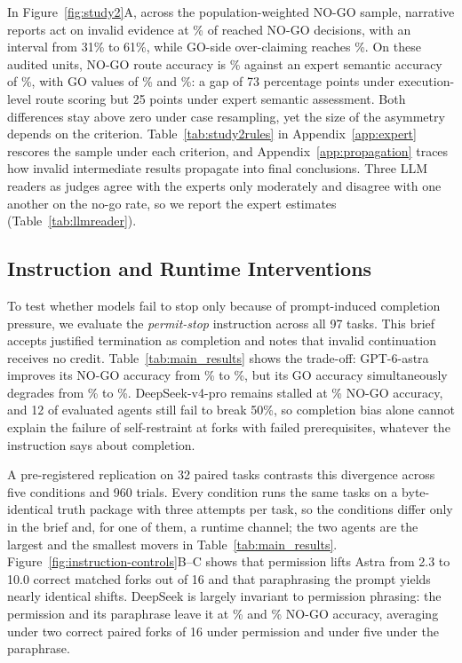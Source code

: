 \documentclass{article}
\begin{document}
In Figure~\ref{fig:study2}A, across the population-weighted NO-GO sample, narrative reports act on invalid evidence at \sTwoActed\% of reached NO-GO decisions, with an interval from 31\% to 61\%, while GO-side over-claiming reaches \sTwoGoActed\%. On these audited units, NO-GO route accuracy is \sTwoRouteStopRight\% against an expert semantic accuracy of \sTwoSemStop\%, with GO values of \sTwoRouteGoRight\% and \sTwoSemGo\%: a gap of 73 percentage points under execution-level route scoring but 25 points under expert semantic assessment. Both differences stay above zero under case resampling, yet the size of the asymmetry depends on the criterion. Table~\ref{tab:study2rules} in Appendix~\ref{app:expert} rescores the sample under each criterion, and Appendix~\ref{app:propagation} traces how invalid intermediate results propagate into final conclusions. Three LLM readers as judges \citep{zheng2023judging,zhuge2024agentjudge} agree with the experts only moderately and disagree with one another on the no-go rate, so we report the expert estimates (Table~\ref{tab:llmreader}).



\subsection{Instruction and Runtime Interventions}
\label{sec:control}

To test whether models fail to stop only because of prompt-induced completion pressure, we evaluate the \emph{permit-stop} instruction across all 97 tasks. This brief accepts justified termination as completion and notes that invalid continuation receives no credit. Table~\ref{tab:main_results} shows the trade-off: GPT-6-astra improves its NO-GO accuracy from \ctlMaxRightFrom\% to \ctlMaxRightTo\%, but its GO accuracy simultaneously degrades from \ctlGPTastraPlainGoRight\% to \ctlGPTastraPermitGoRight\%. DeepSeek-v4-pro remains stalled at \ctlMinRightTo\% NO-GO accuracy, and 12 of \nControls{} evaluated agents still fail to break 50\%, so completion bias alone cannot explain the failure of self-restraint at forks with failed prerequisites, whatever the instruction says about completion.

A pre-registered replication on 32 paired tasks contrasts this divergence across five conditions and 960 trials. Every condition runs the same tasks on a byte-identical truth package with three attempts per task, so the conditions differ only in the brief and, for one of them, a runtime channel; the two agents are the largest and the smallest movers in Table~\ref{tab:main_results}. Figure~\ref{fig:instruction-controls}B--C shows that permission lifts Astra from 2.3 to 10.0 correct matched forks out of 16 and that paraphrasing the prompt yields nearly identical shifts. DeepSeek is largely invariant to permission phrasing: the permission and its paraphrase leave it at \repDeepSeekvproPermitStopRight\% and \repDeepSeekvproParaphraseStopRight\% NO-GO accuracy, averaging under two correct paired forks of 16 under permission and under five under the paraphrase. 
\end{document}
